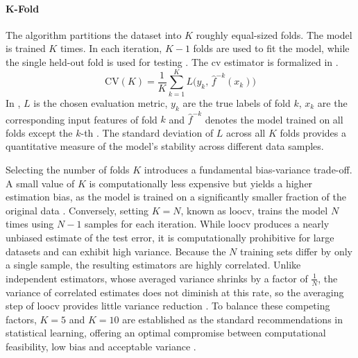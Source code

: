 \paragraph{K-Fold}
The algorithm partitions the dataset into $K$ roughly equal-sized folds. The model is trained $K$ times. In each iteration, $K-1$ folds are used to fit the model, while the single held-out fold is used for testing \parencite{hastieElementsStatisticalLearning2017}. The \gls{cv} estimator is formalized in .
\begin{equation}
    \text{CV}(K) = \frac{1}{K} \sum_{k=1}^{K} L\bigl(y_k,\, \hat{f}^{-k}(x_k)\bigr)
    \label{eq:cv_estimator}
\end{equation}
In , $L$ is the chosen evaluation metric, $y_k$ are the true labels of fold $k$, $x_k$ are the corresponding input features of fold $k$ and $\hat{f}^{-k}$ denotes the model trained on all folds except the $k$-th \parencite{hastieElementsStatisticalLearning2017}. The standard deviation of $L$ across all $K$ folds provides a quantitative measure of the model's stability across different data samples.

Selecting the number of folds $K$ introduces a fundamental bias-variance trade-off. A small value of $K$ is computationally less expensive but yields a higher estimation bias, as the model is trained on a significantly smaller fraction of the original data \parencite{hastieElementsStatisticalLearning2017}. Conversely, setting $K=N$, known as \gls{loocv}, trains the model $N$ times using $N-1$ samples for each iteration. While \gls{loocv} produces a nearly unbiased estimate of the test error, it is computationally prohibitive for large datasets and can exhibit high variance. Because the $N$ training sets differ by only a single sample, the resulting estimators are highly correlated. Unlike independent estimators, whose averaged variance shrinks by a factor of $\frac{1}{N}$, the variance of correlated estimates does not diminish at this rate, so the averaging step of \gls{loocv} provides little variance reduction \parencite{hastieElementsStatisticalLearning2017}. To balance these competing factors, $K=5$ and $K=10$ are established as the standard recommendations in statistical learning, offering an optimal compromise between computational feasibility, low bias and acceptable variance \parencite{hastieElementsStatisticalLearning2017}.

